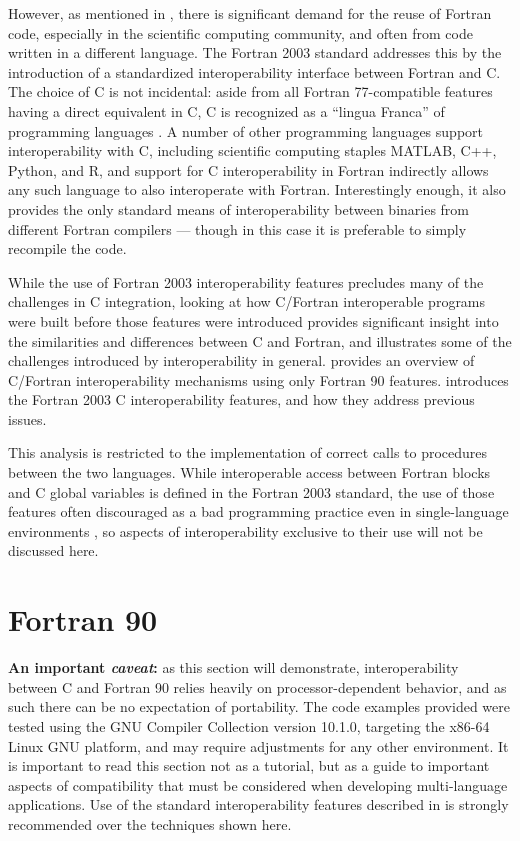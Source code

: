 However, as mentioned in , there is significant demand for the reuse of Fortran code, especially in the scientific computing community, and often from code written in a different language. The Fortran 2003 standard addresses this by the introduction of a standardized interoperability interface between Fortran and C. The choice of C is not incidental: aside from all Fortran 77-compatible features having a direct equivalent in C, C is recognized as a ``lingua Franca'' of programming languages \cite{adams2008fortran}. A number of other programming languages support interoperability with C, including scientific computing staples MATLAB, C++, Python, and R, and support for C interoperability in Fortran indirectly allows any such language to also interoperate with Fortran. Interestingly enough, it also provides the only standard means of interoperability between binaries from different Fortran compilers --- though in this case it is preferable to simply recompile the code.

While the use of Fortran 2003 interoperability features precludes many of the challenges in C integration, looking at how C/Fortran interoperable programs were built before those features were introduced provides significant insight into the similarities and differences between C and Fortran, and illustrates some of the challenges introduced by interoperability in general.  provides an overview of C/Fortran interoperability mechanisms using only Fortran 90 features.  introduces the Fortran 2003 C interoperability features, and how they address previous issues.

This analysis is restricted to the implementation of correct calls to procedures between the two languages. While interoperable access between Fortran  blocks and C global variables is defined in the Fortran 2003 standard, the use of those features often discouraged as a bad programming practice even in single-language environments \cite{clerman2011modern}, so aspects of interoperability exclusive to their use will not be discussed here.

\section{Fortran 90} \label{sec:interop_f90}

\textbf{An important \textit{caveat}:} as this section will demonstrate, interoperability between C and Fortran 90 relies heavily on processor-dependent behavior, and as such there can be no expectation of portability. The code examples provided were tested using the GNU Compiler Collection version 10.1.0, targeting the x86-64 Linux GNU platform, and may require adjustments for any other environment. It is important to read this section not as a tutorial, but as a guide to important aspects of compatibility that must be considered when developing multi-language applications. Use of the standard interoperability features described in  is strongly recommended over the techniques shown here.


